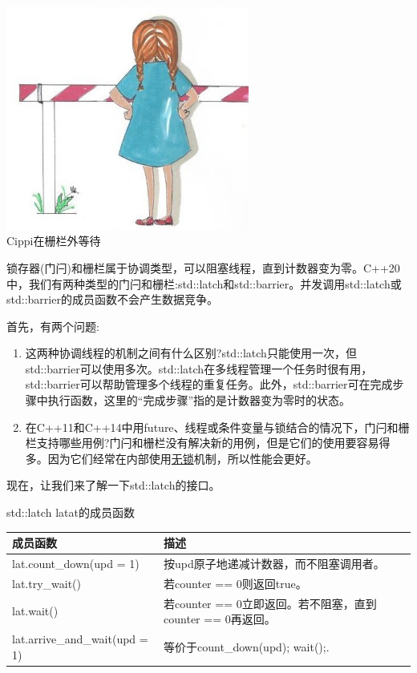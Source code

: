 \begin{center}
\includegraphics[width=0.6\textwidth]{content/3/chapter6/images/18.png}\\
Cippi在栅栏外等待
\end{center}

锁存器(门闩)和栅栏属于协调类型，可以阻塞线程，直到计数器变为零。C++20中，我们有两种类型的门闩和栅栏:std::latch和std::barrier。并发调用std::latch或std::barrier的成员函数不会产生数据竞争。

首先，有两个问题:

\begin{enumerate}
\item 
这两种协调线程的机制之间有什么区别?std::latch只能使用一次，但std::barrier可以使用多次。std::latch在多线程管理一个任务时很有用，std::barrier可以帮助管理多个线程的重复任务。此外，std::barrier可在完成步骤中执行函数，这里的“完成步骤”指的是计数器变为零时的状态。

\item 
在C++11和C++14中用future、线程或条件变量与锁结合的情况下，门闩和栅栏支持哪些用例?门闩和栅栏没有解决新的用例，但是它们的使用要容易得多。因为它们经常在内部使用\href{https://en.wikipedia.org/wiki/Non-blocking_algorithm}{无锁}机制，所以性能会更好。
\end{enumerate}


现在，让我们来了解一下std::latch的接口。

\begin{center}
std::latch latat的成员函数
\end{center}

\begin{table}[H]
\centering
\begin{tabular}{ll}
\textbf{成员函数} & \textbf{描述}          \\ \hline
lat.count\_down(upd = 1)       & 按upd原子地递减计数器，而不阻塞调用者。  \\
lat.try\_wait()          & 若counter == 0则返回true。 \\
lat.wait()                     & 若counter == 0立即返回。若不阻塞，直到counter == 0再返回。 \\
lat.arrive\_and\_wait(upd = 1) &等价于count\_down(upd); wait();.                              
\end{tabular}
\end{table}

